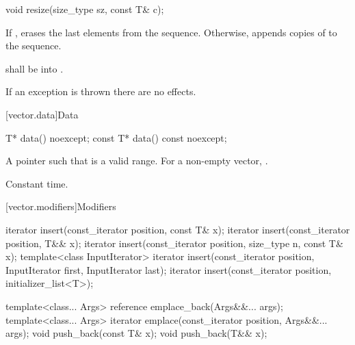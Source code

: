 %
\begin{itemdecl}
void resize(size_type sz, const T& c);
\end{itemdecl}

\begin{itemdescr}
\pnum
\effects If , erases the last  elements
from the sequence. Otherwise,
appends  copies of  to the sequence.

\pnum
\requires {} shall be
 into .

\pnum
\remarks If an exception is thrown there are no effects.
\end{itemdescr}

[vector.data]{Data}

%
\begin{itemdecl}
T*         data() noexcept;
const T*   data() const noexcept;
\end{itemdecl}

\begin{itemdescr}
\pnum
\returns
A pointer such that  is a valid range. For a
non-empty vector,  \tcode{==} .

\pnum
\complexity
Constant time.
\end{itemdescr}

[vector.modifiers]{Modifiers}

%
\begin{itemdecl}
iterator insert(const_iterator position, const T& x);
iterator insert(const_iterator position, T&& x);
iterator insert(const_iterator position, size_type n, const T& x);
template<class InputIterator>
  iterator insert(const_iterator position, InputIterator first, InputIterator last);
iterator insert(const_iterator position, initializer_list<T>);

template<class... Args> reference emplace_back(Args&&... args);
template<class... Args> iterator emplace(const_iterator position, Args&&... args);
void push_back(const T& x);
void push_back(T&& x);
\end{itemdecl}

